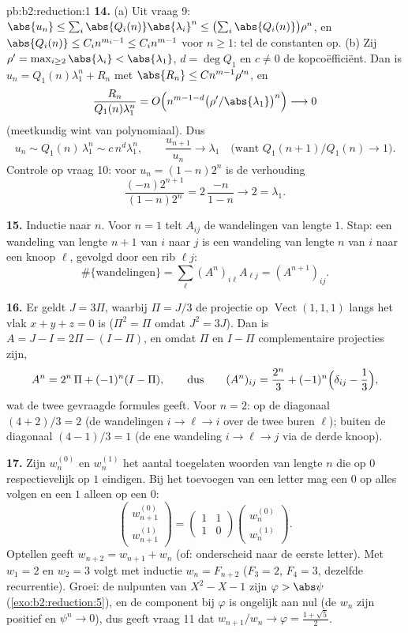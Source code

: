 \begin{solution}{pb:b2:reduction:1}
\textbf{14.} (a) Uit vraag 9: $\abs{u_n} \leq \sum_i
\abs{Q_i(n)}\abs{\lambda_i}^n \leq \bigl(\sum_i
\abs{Q_i(n)}\bigr)\rho^n$, en $\abs{Q_i(n)} \leq C_i n^{m_i - 1}
\leq C_i n^{m-1}$ voor $n \geq 1$: tel de constanten op. (b) Zij
$\rho' = \max_{i \geq 2}\abs{\lambda_i} < \abs{\lambda_1}$, $d =
\deg Q_1$ en $c \neq 0$ de kopcoëfficiënt. Dan is $u_n =
Q_1(n)\lambda_1^n + R_n$ met $\abs{R_n} \leq Cn^{m-1}\rho'^n$, en
\[
\frac{R_n}{Q_1(n)\lambda_1^n} = O\Bigl(n^{m-1-d}
\bigl(\rho'/\abs{\lambda_1}\bigr)^n\Bigr) \longrightarrow 0
\]
(meetkundig wint van polynomiaal). Dus
\[
u_n \sim Q_1(n)\,\lambda_1^n \sim c\,n^d\lambda_1^n,
\qquad
\frac{u_{n+1}}{u_n} \longrightarrow \lambda_1
\quad\text{(want } Q_1(n{+}1)/Q_1(n) \to 1\text{)}.
\]
Controle op vraag 10: voor $u_n = (1-n)2^n$ is de verhouding
\[
\frac{(-n)2^{n+1}}{(1-n)2^n} = 2\,\frac{-n}{1-n}
\longrightarrow 2 = \lambda_1 .
\]

\textbf{15.} Inductie naar $n$. Voor $n = 1$ telt $A_{ij}$ de
wandelingen van lengte $1$. Stap: een wandeling van lengte $n + 1$
van $i$ naar $j$ is een wandeling van lengte $n$ van $i$ naar een
knoop $\ell$, gevolgd door een rib $\ell j$:
\[
\#\{\text{wandelingen}\} = \sum_{\ell} (A^n)_{i\ell}A_{\ell j} =
(A^{n+1})_{ij}.
\]

\textbf{16.} Er geldt $J = 3\Pi$, waarbij $\Pi = J/3$ de projectie
op $\operatorname{Vect}(1,1,1)$ langs het vlak $x + y + z = 0$ is
($\Pi^2 = \Pi$ omdat $J^2 = 3J$). Dan is $A = J - I = 2\Pi - (I -
\Pi)$, en omdat $\Pi$ en $I - \Pi$ complementaire projecties zijn,
\[
A^n = 2^n\,\Pi + (-1)^n (I - \Pi),
\qquad\text{dus}\qquad
(A^n)_{ij} = \frac{2^n}3 + (-1)^n\Bigl(\delta_{ij} -
\frac13\Bigr),
\]
wat de twee gevraagde formules geeft. Voor $n = 2$: op de
diagonaal $(4 + 2)/3 = 2$ (de wandelingen $i \to \ell \to i$ over
de twee buren $\ell$); buiten de diagonaal $(4 - 1)/3 = 1$ (de ene
wandeling $i \to \ell \to j$ via de derde knoop).

\textbf{17.} Zijn $w_n^{(0)}$ en $w_n^{(1)}$ het aantal toegelaten
woorden van lengte $n$ die op $0$ respectievelijk op $1$ eindigen.
Bij het toevoegen van een letter mag een $0$ op alles volgen en een
$1$ alleen op een $0$:
\[
\begin{pmatrix} w_{n+1}^{(0)}\\ w_{n+1}^{(1)}\end{pmatrix}
= \begin{pmatrix} 1 & 1\\ 1 & 0\end{pmatrix}
\begin{pmatrix} w_n^{(0)}\\ w_n^{(1)}\end{pmatrix}.
\]
Optellen geeft $w_{n+2} = w_{n+1} + w_n$ (of: onderscheid naar de
eerste letter). Met $w_1 = 2$ en $w_2 = 3$ volgt met inductie $w_n
= F_{n+2}$ ($F_3 = 2$, $F_4 = 3$, dezelfde recurrentie). Groei: de
nulpunten van $X^2 - X - 1$ zijn $\varphi > \abs\psi$
(\cref{exo:b2:reduction:5}), en de component bij $\varphi$ is
ongelijk aan nul (de $w_n$ zijn positief en $\psi^n \to 0$), dus
geeft vraag 11 dat $w_{n+1}/w_n \to \varphi = \frac{1 + \sqrt5}2$.


\end{solution}
